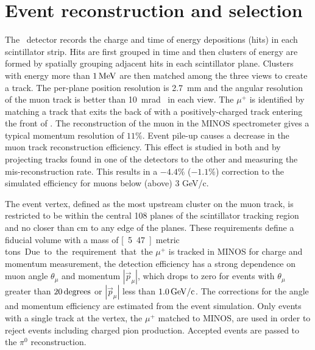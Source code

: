 
\section{Event reconstruction and selection} 

The \minerva\ detector records the charge and time of energy
depositions (hits) in each scintillator strip.  Hits are first grouped
in time and then clusters of energy are formed by spatially grouping
adjacent hits in each scintillator plane.  Clusters with energy
more than $\unit[1]{MeV}$ are then matched among the three views to create a
track. The per-plane position resolution is 2.7~mm and the
angular resolution of the muon track is better than
10~mrad~\cite{minerva_nim} in each view. The $\mu^+$ is identified by matching a
track that exits
the back of \minerva with a positively-charged track entering the
front of \minos. The reconstruction of the muon in the MINOS spectrometer gives
a typical momentum resolution of $11\%$. 
Event pile-up causes a decrease in the muon track reconstruction efficiency. 
This effect is studied in both \minerva and \minos by projecting tracks found in
one of the detectors to the other and measuring the mis-reconstruction rate. 
This results in a $-4.4\%$ ($-1.1\%$) correction to the simulated efficiency for
muons below (above) 3 GeV/c.

The event vertex, defined as the most upstream cluster on the muon track, is restricted to be
within the central 108 planes of the scintillator tracking region and
no closer than \unit[22]{cm} to any edge of the planes. These
requirements define a fiducial volume with a mass of \unit[5.47]{metric tons}.
Due to the requirement that the $\mu^+$ is tracked in MINOS for charge and momentum
measurement, the detection efficiency has a strong dependence on muon angle $\theta_\mu$ and
momentum $|\vec{p}_\mu|$, which drops to zero for  events with  $\theta_\mu$ greater than
$\unit[20]{degrees}$ or $|\vec{p}_\mu|$ less than $\unit[1.0]{GeV/c}$.
The corrections for the angle and momentum efficiency are estimated
from the event simulation. Only events with a single track at the vertex,
 the $\mu^+$ matched to MINOS, are used in order to reject events including
 charged pion production. 
Accepted events are passed to the $\pi^0$ reconstruction.  

